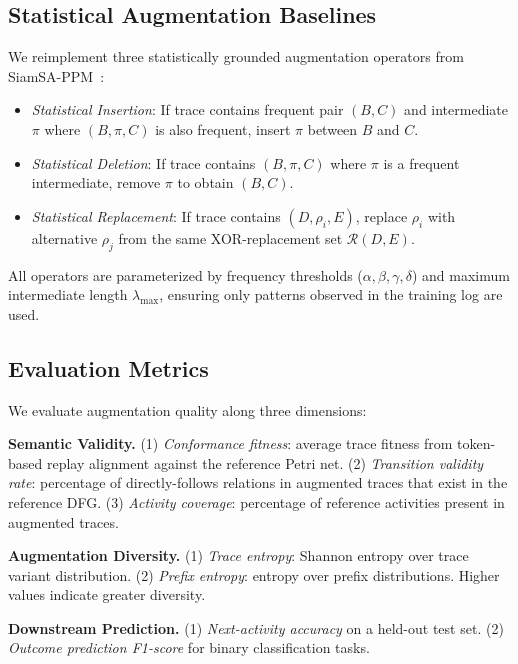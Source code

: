 \documentclass[11pt,a4paper]{article}
\begin{document}
\subsection{Statistical Augmentation Baselines}

We reimplement three statistically grounded augmentation operators from SiamSA-PPM~\cite{vanstraten2025siamsa}:

\begin{itemize}
    \item \emph{Statistical Insertion}: If trace contains frequent pair $(B, C)$ and intermediate $\pi$ where $(B, \pi, C)$ is also frequent, insert $\pi$ between $B$ and $C$.
    \item \emph{Statistical Deletion}: If trace contains $(B, \pi, C)$ where $\pi$ is a frequent intermediate, remove $\pi$ to obtain $(B, C)$.
    \item \emph{Statistical Replacement}: If trace contains $(D, \rho_i, E)$, replace $\rho_i$ with alternative $\rho_j$ from the same XOR-replacement set $\mathcal{R}(D, E)$.
\end{itemize}

All operators are parameterized by frequency thresholds ($\alpha, \beta, \gamma, \delta$) and maximum intermediate length $\lambda_{\max}$, ensuring only patterns observed in the training log are used.

\subsection{Evaluation Metrics}

We evaluate augmentation quality along three dimensions:

\textbf{Semantic Validity.} (1) \emph{Conformance fitness}: average trace fitness from token-based replay alignment against the reference Petri net. (2) \emph{Transition validity rate}: percentage of directly-follows relations in augmented traces that exist in the reference DFG. (3) \emph{Activity coverage}: percentage of reference activities present in augmented traces.

\textbf{Augmentation Diversity.} (1) \emph{Trace entropy}: Shannon entropy over trace variant distribution. (2) \emph{Prefix entropy}: entropy over prefix distributions. Higher values indicate greater diversity.

\textbf{Downstream Prediction.} (1) \emph{Next-activity accuracy} on a held-out test set. (2) \emph{Outcome prediction F1-score} for binary classification tasks.
\end{document}
